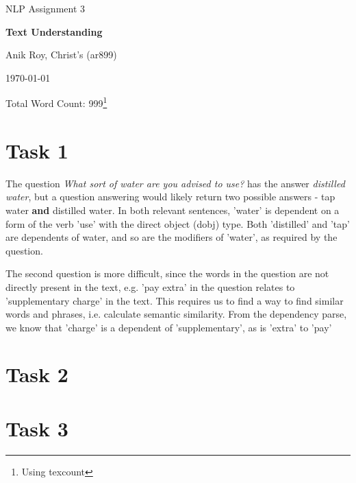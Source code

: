 \documentclass[12pt,a4paper]{article}
\begin{document}
\centerline{\large NLP Assignment 3}
\vspace{0.2in}
\centerline{\Large\bf Text Understanding}
\vspace{0.1in}
\centerline{\large {Anik Roy, Christ's (ar899)}}
\vspace{0.1in}
\centerline{\large {\today}}
\vspace{0.05in}
\centerline{Total Word Count: 999\footnote{Using texcount}}
\vspace{0.2in}



\section*{Task 1}

The question \textit{What sort of water are you advised to use?} has the answer \textit{distilled water}, but a question answering would likely return two possible answers - tap water \textbf{and} distilled water. In both relevant sentences, 'water' is dependent on a form of the verb 'use' with the direct object (dobj) type. Both 'distilled' and 'tap' are dependents of water, and so are the modifiers of 'water', as required by the question.

The second question is more difficult, since the words in the question are not directly present in the text, e.g. 'pay extra' in the question relates to 'supplementary charge' in the text. This requires us to find a way to find similar words and phrases, i.e. calculate semantic similarity. From the dependency parse, we know that 'charge' is a dependent of 'supplementary', as is 'extra' to 'pay'

\section*{Task 2}
\section*{Task 3}


\end{document}

